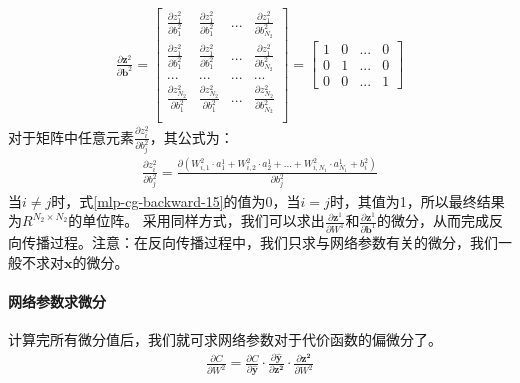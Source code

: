 \documentclass[UTF8]{article}
\begin{document}
\begin{equation}
\begin{aligned}
\frac{\partial{\boldsymbol{z}^2}}{\partial{\boldsymbol{b}^2}}=\begin{bmatrix}
\frac{\partial{z^2_1}}{\partial{b^2_1}} & \frac{\partial{z^2_1}}{\partial{b^2_1}} & ... & \frac{\partial{z^2_1}}{\partial{b^2_{N_2}}}\\
\frac{\partial{z^2_1}}{\partial{b^2_1}} & \frac{\partial{z^2_1}}{\partial{b^2_1}} & ... & \frac{\partial{z^2_1}}{\partial{b^2_{N_2}}}\\
... & ... & ... & ... \\
\frac{\partial{z^2_{N_2}}}{\partial{b^2_1}} & \frac{\partial{z^2_{N_2}}}{\partial{b^2_1}} & ... & \frac{\partial{z^2_{N_2}}}{\partial{b^2_{N_2}}}\\
\end{bmatrix}=\begin{bmatrix}
1 & 0 & ... & 0 \\
0 & 1 & ... & 0 \\
0 & 0 & ... & 1
\end{bmatrix}
\end{aligned}
\label{mlp-cg-backward-14}
\end{equation}
对于矩阵中任意元素$\frac{\partial{z^2_i}}{\partial{b^2_j}}$，其公式为：
\begin{equation}
\begin{aligned}
\frac{\partial{z^2_i}}{\partial{b^2_j}}=\frac{\partial{(W^2_{i,1} \cdot a^1_1 + W^2_{i,2} \cdot a^1_2 + ... + W^2_{i,N_1} \cdot a^1_{N_1} + b^2_i)}}{\partial{b^2_j}}
\end{aligned}
\label{mlp-cg-backward-15}
\end{equation}
当$i \ne j$时，式\ref{mlp-cg-backward-15}的值为0，当$i=j$时，其值为1，所以最终结果为$R^{N_2 \times N_2}$的单位阵。
采用同样方式，我们可以求出$\frac{\partial{\boldsymbol{z}^1}}{\partial{W^1}}$和$\frac{\partial{\boldsymbol{z}^1}}{\partial{\boldsymbol{b}^1}}$的微分，从而完成反向传播过程。注意：在反向传播过程中，我们只求与网络参数有关的微分，我们一般不求对$\boldsymbol{x}$的微分。
\paragraph{网络参数求微分}
计算完所有微分值后，我们就可求网络参数对于代价函数的偏微分了。
\begin{equation}
\begin{aligned}
\frac{\partial{C}}{\partial{W^2}}=\frac{\partial{C}}{\partial{\hat{\boldsymbol{y}}}} \cdot \frac{\partial{\hat{\boldsymbol{y}}}}{\partial{\boldsymbol{z^2}}} \cdot \frac{\partial{\boldsymbol{z^2}}}{\partial{W^2}}
\end{aligned}
\label{mlp-cg-backward-16}
\end{equation}
\end{document}

